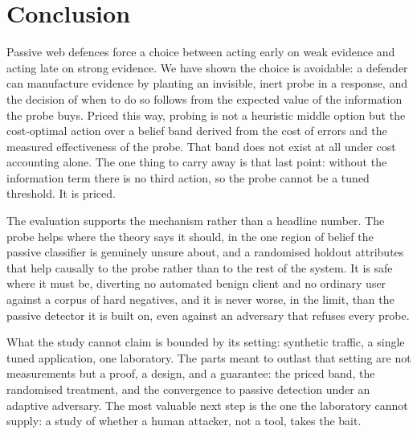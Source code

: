 
\section{Conclusion}

Passive web defences force a choice between acting early on weak evidence and
acting late on strong evidence. We have shown the choice is avoidable: a defender
can manufacture evidence by planting an invisible, inert probe in a response, and
the decision of when to do so follows from the expected value of the information
the probe buys. Priced this way, probing is not a heuristic middle option but the
cost-optimal action over a belief band derived from the cost of errors and the
measured effectiveness of the probe. That band does not exist at all under cost
accounting alone. The one thing to carry away is that last point: without the
information term there is no third action, so the probe cannot be a tuned
threshold. It is priced.

The evaluation supports the mechanism rather than a headline number. The probe
helps where the theory says it should, in the one region of belief the passive
classifier is genuinely unsure about, and a randomised holdout attributes that
help causally to the probe rather than to the rest of the system. It is safe where
it must be, diverting no automated benign client and no ordinary user against a
corpus of hard negatives, and it is never worse, in the limit, than the passive
detector it is built on, even against an adversary that refuses every probe.

What the study cannot claim is bounded by its setting: synthetic traffic, a single
tuned application, one laboratory. The parts meant to outlast that setting are not
measurements but a proof, a design, and a guarantee: the priced band, the
randomised treatment, and the convergence to passive detection under an adaptive
adversary. The most valuable next step is the one the laboratory cannot supply: a
study of whether a human attacker, not a tool, takes the bait.
